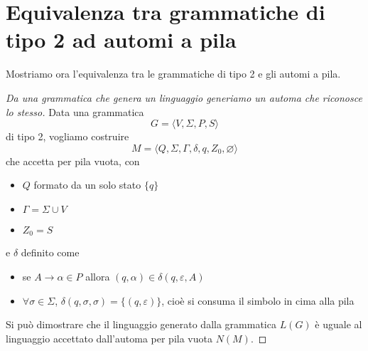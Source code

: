\documentclass[12pt]{report}
\theoremstyle{definition}
\theoremstyle{regard}
\begin{document}
\section{Equivalenza tra grammatiche di tipo 2 ad automi a pila}
Mostriamo ora l'equivalenza tra le grammatiche di tipo 2 e gli automi a pila.
\begin{proof}[Da una grammatica che genera un linguaggio generiamo un automa che riconosce lo stesso]
Data una grammatica
$$ G = \langle V, \Sigma, P, S \rangle $$
di tipo 2, vogliamo costruire
$$ M = \langle Q, \Sigma, \Gamma, \delta, q, Z_0, \varnothing \rangle $$
che accetta per pila vuota, con
\begin{itemize}
 	\item $Q$ formato da un solo stato $\{q\}$
 	\item $\Gamma = \Sigma \cup V$
 	\item $Z_0 = S$
\end{itemize}
e $\delta$ definito come
\begin{itemize}
 	\item se $A \rightarrow \alpha \in P$ allora $(q, \alpha) \in \delta(q, \varepsilon, A)$
 	\item $\forall \sigma \in \Sigma$, $\delta(q, \sigma, \sigma) = \{ (q, \varepsilon) \}$, cioè si consuma il simbolo in cima alla pila
\end{itemize}
 
Si può dimostrare che il linguaggio generato dalla grammatica $L(G)$ è uguale al linguaggio accettato dall'automa per pila vuota $N(M)$.
\end{proof}
\end{document}
